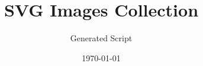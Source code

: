 \documentclass[11pt]{article}
\begin{document}
\title{\Large SVG Images Collection}
\author{Generated Script}
\date{\today}
\maketitle
\thispagestyle{empty}
\tableofcontents
\thispagestyle{empty}
\clearpage
{}



\end{document}
